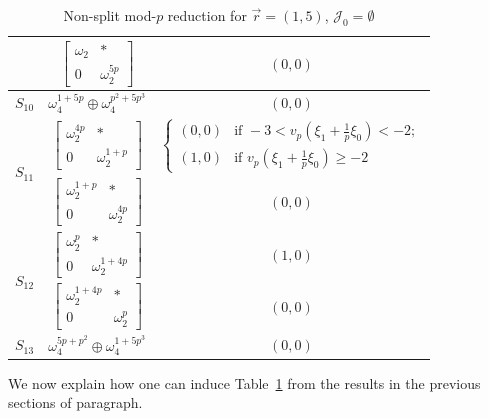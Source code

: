 \documentclass[11pt]{amsart}
\theoremstyle{definition}
\numberwithin{equation}{subsection}
\theoremstyle{plain}
\theoremstyle{plain}
\theoremstyle{plain}
\theoremstyle{plain}
\theoremstyle{plain}
\theoremstyle{plain}
\theoremstyle{plain}
\theoremstyle{plain}
\theoremstyle{plain}
\theoremstyle{plain}
\theoremstyle{plain}
\theoremstyle{plain}
\theoremstyle{definition}
\theoremstyle{definition}
\theoremstyle{definition}
\theoremstyle{remark}
\renewcommand{\(}{\textup{(}}
\renewcommand{\)}{\textup{)}}
\newcommand{\cJ}{\mathcal{J}}
\newcommand{\vr}{\vec{r}}
\begin{document}
\begin{table}[htbp]
\begin{tabular}{|c||c|c|}
            & $
            \begin{bmatrix}
                \omega_2 & * \\ 0 & \omega_2^{5p}
            \end{bmatrix}$
            & $(0,0)$ \\\hline
        $S_{10}$
            & $\omega_4^{1+5p}\oplus\omega_4^{p^2+5p^3}$
            & $(0,0)$ \\\hline
        \multirow{2}{*}[-1.5ex]{$S_{11}$}
            & $
            \begin{bmatrix}
                \omega_2^{4p} & * \\ 0 & \omega_2^{1+p}
            \end{bmatrix}$
            & $
            \begin{cases}
                (0,0) &\mbox{if } -3<v_p(\xi_1+\frac{1}{p}\xi_0)<-2;\\
                (1,0) &\mbox{if }v_p(\xi_1+\frac{1}{p}\xi_0)\geq -2 
            \end{cases}$\\\cline{2-3}
            & $
            \begin{bmatrix}
                \omega_2^{1+p} & * \\ 0 & \omega_2^{4p}
            \end{bmatrix}$
            & $(0,0)$ \\\hline
        \multirow{2}{*}[-0.5em]{$S_{12}$}
            & $
            \begin{bmatrix}
                \omega_2^p & * \\ 0 & \omega_2^{1+4p}
            \end{bmatrix}$
            & $(1,0)$ \\\cline{2-3}
            & $
            \begin{bmatrix}
                \omega_2^{1+4p} & * \\ 0 & \omega_2^p
            \end{bmatrix}$
            & $(0,0)$ \\\hline
        $S_{13}$
            & $\omega_4^{5p+p^2}\oplus\omega_4^{1+5p^3}$
            & $(0,0)$ \\
        \hline
    \end{tabular}
    \caption{Non-split mod-$p$ reduction for $\vr=(1,5)$, $\cJ_0=\emptyset$}
    \label{tab:summary for vr=(1,5), cJ=empty}
\end{table}
We now explain how one can induce Table~\ref{tab:summary for vr=(1,5), cJ=empty} from the results in the previous sections of paragraph.
\end{document}
